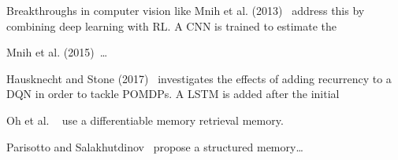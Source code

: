 \cite{arulkumaran_survey_2017} %




Breakthroughs in computer vision like 
Mnih et al. (2013)~\cite{mnih_atari_2013} address this by combining deep learning with RL.
A CNN is trained to estimate the 

Mnih et al. (2015)~\cite{mnih_human_2015}\dots


Hausknecht and Stone (2017)~\cite{hausknecht_stone_2017} investigates the effects of adding recurrency to a DQN in order to tackle POMDPs.
A LSTM is added after the initial 

Oh et al. ~\cite{oh_minecraft_2016} use a differentiable memory retrieval memory.

Parisotto and Salakhutdinov~\cite{parisotto_salakhutdinov_2017} propose a structured memory\dots %





